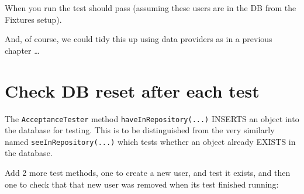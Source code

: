 \documentclass[a4paperpaper,openright]{book}
\newenvironment{Shaded}{}{}
\newcommand{\CommentTok}[1]{\textcolor[rgb]{0.38,0.63,0.69}{\textit{#1}}}
\newcommand{\KeywordTok}[1]{\textcolor[rgb]{0.00,0.44,0.13}{\textbf{#1}}}
\newcommand{\NormalTok}[1]{#1}
\newcommand{\OtherTok}[1]{\textcolor[rgb]{0.00,0.44,0.13}{#1}}
\newcommand{\StringTok}[1]{\textcolor[rgb]{0.25,0.44,0.63}{#1}}
\begin{document}
When you run the test should pass (assuming these users are in the DB
from the Fixtures setup).

And, of course, we could tidy this up using data providers as in a
previous chapter \ldots{}

\hypertarget{check-db-reset-after-each-test}{%
\section{Check DB reset after each
test}\label{check-db-reset-after-each-test}}

The \texttt{AcceptanceTester} method \texttt{haveInRepository(...)}
INSERTS an object into the database for testing. This is to be
distinguished from the very similarly named
\texttt{seeInRepository(...)} which tests whether an object already
EXISTS in the database.

Add 2 more test methods, one to create a new user, and test it exists,
and then one to check that that new user was removed when its test
finished running:

\begin{Shaded}
\end{Shaded}
\end{document}
